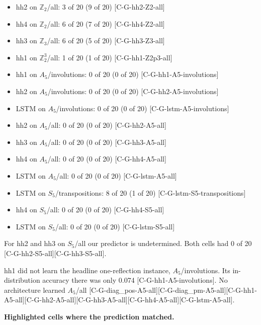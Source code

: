 \documentclass[10pt,twocolumn,a4paper]{article}
\providecommand{\tightlist}{\setlength{\itemsep}{0pt}\setlength{\parskip}{0pt}}
\begin{document}
\begin{itemize}
\tightlist
\item
  hh2 on \(\mathbb{Z}_2\)/all: 3 of 20 (9 of 20) {[}C-G-hh2-Z2-all{]}
\item
  hh4 on \(\mathbb{Z}_2\)/all: 6 of 20 (7 of 20) {[}C-G-hh4-Z2-all{]}
\item
  hh3 on \(\mathbb{Z}_3\)/all: 6 of 20 (5 of 20) {[}C-G-hh3-Z3-all{]}
\item
  hh1 on \(\mathbb{Z}_2^3\)/all: 1 of 20 (1 of 20) {[}C-G-hh1-Z2p3-all{]}
\item
  hh1 on \(A_5\)/involutions: 0 of 20 (0 of 20) {[}C-G-hh1-A5-involutions{]}
\item
  hh2 on \(A_5\)/involutions: 0 of 20 (0 of 20) {[}C-G-hh2-A5-involutions{]}
\item
  LSTM on \(A_5\)/involutions: 0 of 20 (0 of 20) {[}C-G-lstm-A5-involutions{]}
\item
  hh2 on \(A_5\)/all: 0 of 20 (0 of 20) {[}C-G-hh2-A5-all{]}
\item
  hh3 on \(A_5\)/all: 0 of 20 (0 of 20) {[}C-G-hh3-A5-all{]}
\item
  hh4 on \(A_5\)/all: 0 of 20 (0 of 20) {[}C-G-hh4-A5-all{]}
\item
  LSTM on \(A_5\)/all: 0 of 20 (0 of 20) {[}C-G-lstm-A5-all{]}
\item
  LSTM on \(S_5\)/transpositions: 8 of 20 (1 of 20) {[}C-G-lstm-S5-transpositions{]}
\item
  hh4 on \(S_5\)/all: 0 of 20 (0 of 20) {[}C-G-hh4-S5-all{]}
\item
  LSTM on \(S_5\)/all: 0 of 20 (0 of 20) {[}C-G-lstm-S5-all{]}
\end{itemize}

For hh2 and hh3 on \(S_5\)/all our predictor is undetermined. Both cells had 0 of 20 {[}C-G-hh2-S5-all{]}{[}C-G-hh3-S5-all{]}.

hh1 did not learn the headline one-reflection instance, \(A_5\)/involutions. Its in-distribution accuracy there was only 0.074 {[}C-G-hh1-A5-involutions{]}. No architecture learned \(A_5\)/all {[}C-G-diag\_pos-A5-all{]}{[}C-G-diag\_pm-A5-all{]}{[}C-G-hh1-A5-all{]}{[}C-G-hh2-A5-all{]}{[}C-G-hh3-A5-all{]}{[}C-G-hh4-A5-all{]}{[}C-G-lstm-A5-all{]}.

\textbf{Highlighted cells where the prediction matched.}
\end{document}

